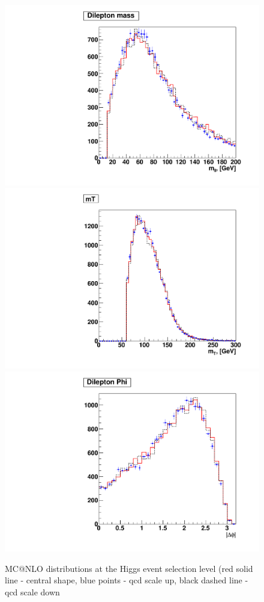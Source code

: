 \begin{figure}[!hbtp]
\centering
\includegraphics[width=.45\textwidth]{figures/wwshape_mcatnlo_mll_hww}
\includegraphics[width=.45\textwidth]{figures/wwshape_mcatnlo_mt_hww}
\includegraphics[width=.45\textwidth]{figures/wwshape_mcatnlo_dphi_hww}
\caption{MC@NLO distributions at the Higgs event selection level (red solid line - central shape, blue points - qcd scale up, black dashed line - qcd scale down}
\label{fig:appendix_wwshape_mcatnlo_hww}
\end{figure}

